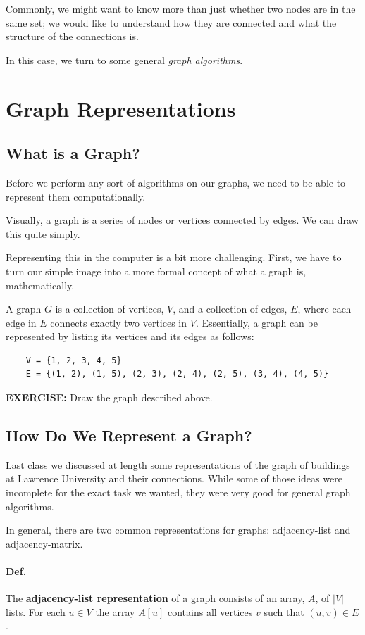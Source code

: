 \documentclass[12pt]{article}
\begin{document}
Commonly, we might want to know more than just whether two nodes are in the same set; we would like to understand how they are connected and what the structure of the connections is. 

In this case, we turn to some general \textit{graph algorithms}.

\section*{Graph Representations}

\subsection*{What is a Graph?}

Before we perform any sort of algorithms on our graphs, we need to be able to represent them computationally. 

Visually, a graph is a series of nodes or vertices connected by edges. We can draw this quite simply. 

Representing this in the computer is a bit more challenging. First, we have to turn our simple image into a more formal concept of what a graph is, mathematically. 

A graph $G$ is a collection of vertices, $V$, and a collection of edges, $E$, where each edge in $E$ connects exactly two vertices in $V$. Essentially, a graph can be represented by listing its vertices and its edges as follows:

\begin{verbatim}
    V = {1, 2, 3, 4, 5}
    E = {(1, 2), (1, 5), (2, 3), (2, 4), (2, 5), (3, 4), (4, 5)}
\end{verbatim}

\textbf{EXERCISE:} Draw the graph described above. 

\subsection*{How Do We Represent a Graph?}

Last class we discussed at length some representations of the graph of buildings at Lawrence University and their connections. While some of those ideas were incomplete for the exact task we wanted, they were very good for general graph algorithms. 

In general, there are two common representations for graphs: adjacency-list and adjacency-matrix.

\paragraph{Def.} The \textbf{adjacency-list representation} of a graph consists of an array, $A$, of $|V|$ lists. For each $u \in V$ the array $A[u]$ contains all vertices $v$ such that $(u, v) \in E$.
\end{document}
